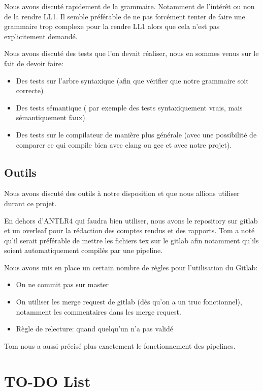 \documentclass[french]{article}
\begin{document}
Nous avons discuté rapidement de la grammaire. Notamment de l'intérêt ou non de la rendre LL1. Il semble préférable de ne pas forcément tenter de faire une grammaire trop complexe pour la rendre LL1 alors que cela n'est pas explicitement demandé.

Nous avons discuté des tests que l'on devait réaliser, nous en sommes venus sur le fait de devoir faire: 
\begin{itemize}
    \item Des tests sur l'arbre syntaxique (afin que vérifier que notre grammaire soit correcte)
    \item Des tests sémantique ( par exemple des tests syntaxiquement vrais, mais sémantiquement faux)
    \item Des tests sur le compilateur de manière plus générale (avec une possibilité de comparer ce qui compile bien avec clang ou gcc et avec notre projet).
\end{itemize}


\subsection*{Outils}

Nous avons discuté des outils à notre disposition et que nous allions utiliser durant ce projet. 

En dehors d'ANTLR4 qui faudra bien utiliser, nous avons le repository sur gitlab et un overleaf pour la rédaction des comptes rendus et des rapports.
Tom a noté qu'il serait préférable de mettre les fichiers tex sur le gitlab afin notamment qu'ils soient automatiquement compilés par une pipeline.

Nous avons mis en place un certain nombre de règles pour l'utilisation du Gitlab:
\begin{itemize}
    \item On ne commit pas sur master 
    \item On utiliser les merge request de gitlab (dès qu'on a un truc fonctionnel), notamment les commentaires dans les merge request.
    \item Règle de relecture: quand quelqu'un n'a pas validé 
\end{itemize}

Tom nous a aussi précisé plus exactement le fonctionnement des pipelines.

\section*{TO-DO List}
\end{document}
